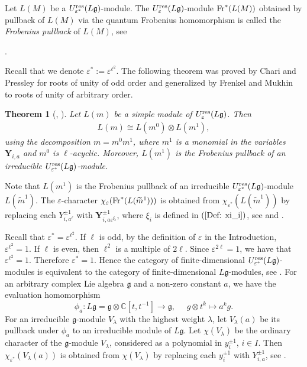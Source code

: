 \documentclass[12pt, reqno]{amsart}
\newtheorem{theorem}{Theorem}[section]
\numberwithin{equation}{section}
\newcommand{\res}{{\rm res}}
\begin{document}
Let $L(M)$ be a $U_{\varepsilon^{\ast}}^{\res}({L\mathfrak{g}})$-module. The $U_\varepsilon^{\res}({L\mathfrak{g}})$-module
${\rm Fr}^{\ast}(L(M))$ obtained by pullback of $L(M)$ via the quantum Frobenius homomorphism is called the \textit{Frobenius pullback} of $L(M)$, see {\cite[Section 5.2]{FM02}.

Recall that we denote $\varepsilon^{*}:=\varepsilon^{\ell^2}$. The following theorem was proved by Chari and Pressley \cite{CP97b} for roots of unity of odd order and generalized by Frenkel and Mukhin \cite{FM02} to roots of unity of arbitrary order.

\begin{theorem}[{\cite[Theorem 9.1]{CP97b}}, {\cite[Theorem 5.4]{FM02}}]\label{Th:decomposition}
Let $L(m)$ be a simple module of $U_\varepsilon^{\res}({L\mathfrak{g}})$. Then
\begin{align*}
L(m)\cong L(m^{0})\otimes L(m^{1}),
\end{align*}
using the decomposition $m=m^{0}m^{1}$, where $m^{1}$ is a monomial in the variables $\mathbf{Y}_{i,a}$ and $m^{0}$ is $\ell$-acyclic. Moreover, $L(m^1)$ is the Frobenius pullback of an irreducible $U_{{\varepsilon}^{\ast}}^{\res}({L\mathfrak{g}})$-module.
\end{theorem}
Note that $L(m^1)$ is the Frobenius pullback of an irreducible $U_{{\varepsilon}^{\ast}}^{\res}({L\mathfrak{g}})$-module $L(\widetilde{m}^1)$. The $\varepsilon$-character $\chi_{\varepsilon}({\rm Fr}^{\ast}(L(\widetilde{m}^1)))$ is obtained from $\chi_{\varepsilon^{\ast}}(L(\widetilde{m}^1))$ by replacing each $Y_{i,a^\ell}^{\pm 1}$ with $\mathbf{Y}_{i,a\varepsilon^{\xi_i}}^{\pm 1}$, where $\xi_i$ is defined in $(\ref{Def: xi_i})$, see \cite[Theorem 5.7]{FM02} and \cite[Section 3]{G16}.


Recall that $\varepsilon^{*}=\varepsilon^{\ell^2}$. If $\ell$ is odd, by the definition of $\varepsilon$ in the Introduction, $\varepsilon^{\ell^2}=1$. If $\ell$ is even, then $\ell^2$ is a multiple of $2\ell$. Since $\varepsilon^{2\ell}=1$, we have that $\varepsilon^{\ell^2}=1$. Therefore $\varepsilon^*=1$. Hence the category of finite-dimensional $U_{{\varepsilon}^{*}}^{\res}({L\mathfrak{g}})$-modules is equivalent to the category of finite-dimensional $L\mathfrak{g}$-modules, see \cite[Section 5.4]{FM02}. For an arbitrary complex Lie algebra $\mathfrak{g}$ and a non-zero constant $a$, we have the evaluation homomorphism
\[\phi_a: L{\mathfrak{g}}=\mathfrak{g}\otimes\mathbb{C}[t,t^{-1}]\rightarrow \mathfrak{g},\quad\,\, g\otimes t^k\mapsto a^kg.\]
For an irreducible $\mathfrak{g}$-module $V_{\lambda}$ with the highest weight $\lambda$, let $V_\lambda(a)$ be its pullback under $\phi_a$ to an irreducible module of $L{\mathfrak{g}}$. Let $\chi(V_\lambda)$ be the ordinary character of the $\mathfrak{g}$-module $V_\lambda$, considered as a polynomial in $y_i^{\pm 1}$, $i\in I$. Then $\chi_{{\varepsilon}^\ast}(V_\lambda(a))$ is obtained from $\chi(V_\lambda)$ by replacing each $y_i^{\pm 1}$ with $Y_{i,a}^{\pm 1}$, see {\cite[Lemma 5.8]{FM02}}.

}
\end{document}

